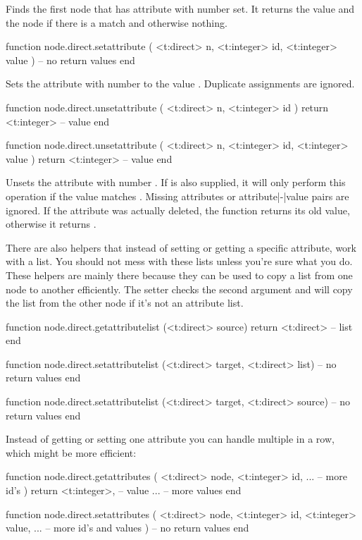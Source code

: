 Finds the first node that has attribute with number  set. It returns
the value and the node if there is a match and otherwise nothing.

\starttyping[option=LUA]
function node.direct.setattribute ( <t:direct> n, <t:integer> id, <t:integer> value )
    -- no return values
end
\stoptyping

Sets the attribute with number  to the value . Duplicate
assignments are ignored.

\starttyping[option=LUA]
function node.direct.unsetattribute ( <t:direct> n, <t:integer> id )
    return <t:integer> -- value
end

function node.direct.unsetattribute ( <t:direct> n, <t:integer> id, <t:integer> value )
    return <t:integer> -- value
end
\stoptyping

Unsets the attribute with number . If  is also supplied,
it will only perform this operation if the value matches . Missing
attributes or attribute|-|value pairs are ignored. If the attribute was actually
deleted, the function returns its old value, otherwise it returns .

There are also helpers that instead of setting or getting a specific attribute,
work with a list. You should not mess with these lists unless you're sure what
you do. These helpers are mainly there because they can be used to copy a list
from one node to another efficiently. The setter checks the second argument and
will copy the list from the other node if it's not an attribute list.

\starttyping[option=LUA]
function node.direct.getattributelist (<t:direct> source)
    return <t:direct> -- list
end

function node.direct.setattributelist (<t:direct> target, <t:direct> list)
    -- no return values
end

function node.direct.setattributelist (<t:direct> target, <t:direct> source)
    -- no return values
end
\stoptyping

Instead of getting or setting one attribute you can handle multiple in a row,
which might be more efficient:

\starttyping[option=LUA]
function node.direct.getattributes (
    <t:direct>  node,
    <t:integer> id,
    ...              -- more id's
)
    return
        <t:integer>, -- value
        ...          -- more values
end

function node.direct.setattributes (
    <t:direct>  node,
    <t:integer> id,
    <t:integer> value,
    ...                -- more id's and values
)
    -- no return values
end
\stoptyping

